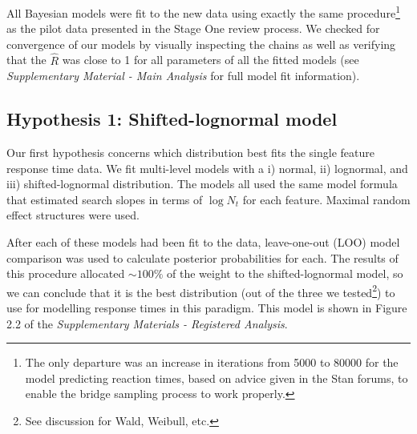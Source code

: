\documentclass[preprint,12pt,authoryear]{elsarticle}
\begin{document}
All Bayesian models were fit to the new data using exactly the same procedure\footnote{The only departure was an increase in iterations from 5000 to 80000 for the model predicting reaction times, based on advice given in the Stan forums, to enable the bridge sampling process to work properly.} as the pilot data presented in the Stage One review process. We checked for convergence of our models by visually inspecting the chains as well as verifying that the $\hat{R}$ was close to 1 for all parameters of all the fitted models (see \textit{Supplementary Material - Main Analysis} for full model fit information).

\subsection{Hypothesis 1: Shifted-lognormal model}

Our first hypothesis concerns which distribution best fits the single feature response time data. We fit multi-level models with
a i) normal, ii) lognormal, and iii) shifted-lognormal distribution. The models all used the same model formula that estimated search slopes in terms of $\log{N_t}$ for each feature. Maximal random effect structures were used. 

After each of these models had been fit to the data, leave-one-out (LOO) model comparison was used to calculate posterior probabilities for each. The results of this procedure allocated $\sim100\%$ of the weight to the shifted-lognormal model, so we can conclude that it is the best distribution (out of the three we tested\footnote{See discussion for Wald, Weibull, etc.}) to use for modelling response times in this paradigm. This model is shown in Figure 2.2 of the \textit{Supplementary Materials - Registered Analysis}.

\end{document}
